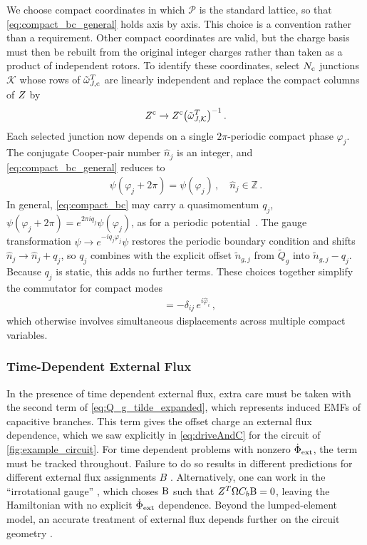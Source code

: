 We choose compact coordinates in which $\mathcal P$ is the standard lattice, so that \cref{eq:compact_bc_general} holds axis by axis.
This choice is a convention rather than a requirement.
Other compact coordinates are valid, but the charge basis must then be rebuilt from the original integer charges rather than taken as a product of independent rotors.
To identify these coordinates, select $N_{\rm c}$ junctions $\mathcal K$ whose rows of $\tilde\omega_{J,\rm c}^T$ are linearly independent and replace the compact columns of $Z$ by
\begin{align}
    Z^{\rm c}\to Z^{\rm c}\bigl(\tilde\omega_{J,\mathcal K}^T\bigr)^{-1} \, .
    \label{eq:reference_compact}
\end{align}
Each selected junction now depends on a single $2\pi$-periodic compact phase $\varphi_j$.
The conjugate Cooper-pair number $\hat n_j$ is an integer, and \cref{eq:compact_bc_general} reduces to
\begin{align}
    \psi(\varphi_j+2\pi)=\psi(\varphi_j)\,, \quad \hat n_j\in\mathbb Z \, .
    \label{eq:compact_bc}
\end{align}
In general, \cref{eq:compact_bc} may carry a quasimomentum $q_j$, $\psi(\varphi_j+2\pi)=e^{2\pi i q_j}\psi(\varphi_j)$, as for a periodic potential~\cite{ashcroft_solid_1976, likharev_theory_1985}.
The gauge transformation $\psi\to e^{-iq_j\varphi_j}\psi$ restores the periodic boundary condition and shifts $\hat n_j\to\hat n_j+q_j$, so $q_j$ combines with the explicit offset $\tilde n_{g,j}$ from $\tilde Q_g$ into $\tilde n_{g,j}-q_j$.
Because $q_j$ is static, this adds no further terms.
These choices together simplify the commutator for compact modes
\begin{align}
    [e^{i\hat\varphi_i},\hat n_j]&=-\delta_{ij}\,e^{i\hat\varphi_i}\, ,\label{eq:compact_commutator} 
\end{align}
which otherwise involves simultaneous displacements across multiple compact variables.

\subsubsection{Time-Dependent External Flux}\label{sec:tdflux}

In the presence of time dependent external flux, extra care must be taken with the second term of \cref{eq:Q_g_tilde_expanded}, which represents induced EMFs of capacitive branches. 
This term gives the offset charge an external flux dependence, which we saw explicitly in \cref{eq:driveAndC} for the circuit of \cref{fig:example_circuit}. 
For time dependent problems with nonzero $\dot \Phi _{\rm ext}$, the term must be tracked throughout.
Failure to do so results in different predictions for different external flux assignments $B$ \cite{YouKoch2019,RiwarDiVincenzo2022, BryonExtFlux2023}.
Alternatively, one can work in the ``irrotational gauge'' \cite{YouKoch2019}, which choses $\mathrm{B}$ such that $Z^T\Omega C_b \mathrm{B} = 0$, leaving the Hamiltonian with no explicit $\dot \Phi_{\rm ext}$ dependence. 
Beyond the lumped-element model, an accurate treatment of external flux depends further on the circuit geometry \cite{RiwarDiVincenzo2022}.

